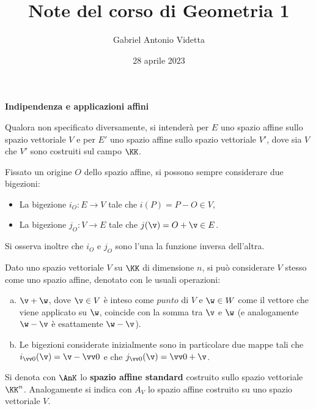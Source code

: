 \documentclass[11pt]{article}
\title{\textbf{Note del corso di Geometria 1}}
\author{Gabriel Antonio Videtta}
\date{28 aprile 2023}
\begin{document}
	
	\maketitle
	
	\begin{center}
		\Large \textbf{Indipendenza e applicazioni affini}
	\end{center}
	
	\begin{note} Qualora non specificato diversamente, si intenderà per
		$E$ uno spazio affine sullo spazio vettoriale $V$ e
		per $E'$ uno spazio affine sullo spazio vettoriale $V'$, dove sia $V$ che $V'$ sono costruiti
		sul campo $\KK$.
	\end{note}
	
	Fissato un origine $O$ dello spazio affine, si possono sempre considerare due
	bigezioni:
	
	\begin{itemize}
		\item La bigezione $i_O : E \to V$ tale che $i(P) = P - O \in V$,
		\item La bigezione $j_O : V \to E$ tale che $j(\v) = O + \v \in E$.
	\end{itemize}
	
	Si osserva inoltre che $i_O$ e $j_O$ sono l'una la funzione inversa dell'altra.
	
	Dato uno spazio vettoriale $V$ su $\KK$ di dimensione $n$, si può considerare $V$ stesso
	come uno spazio affine, denotato  con le usuali operazioni:
	
	\begin{enumerate}[(a)]
		\item $\v + \w$, dove $\v \in V$ è inteso come $\mathit{punto}$ di $V$ e $\w \in W$ come
		il vettore che viene applicato su $\w$, coincide con la somma tra $\v$ e $\w$ (e analogamente
		$\w - \v$ è esattamente $\w - \v$).
		
		\item Le bigezioni considerate inizialmente sono in particolare due mappe tali che
		$i_{\vv 0}(\v) = \v - \vv 0$ e che $j_{\vv 0}(\v) = \vv 0 + \v$.
	\end{enumerate}
	
	\begin{definition} 
		Si denota con $\AnK$ lo \textbf{spazio affine standard} costruito sullo spazio vettoriale
		$\KK^n$. Analogamente si indica con $A_V$ lo spazio affine costruito su uno spazio
		vettoriale $V$.
	\end{definition}
\end{document}
